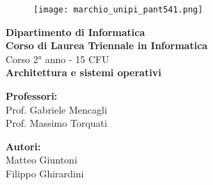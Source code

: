 \begin{titlepage} %
\begin{figure}[t] %
    \centering\texttt{[image: marchio\_unipi\_pant541.png]}
\end{figure}
\vspace{20mm}

\begin{Large}
 \begin{center}
	\textbf{Dipartimento di Informatica\\ Corso di Laurea Triennale in Informatica\\}
	\vspace{20mm}
    {\LARGE{Corso 2° anno - 15 CFU}}\\
	\vspace{10mm}
	{\huge{\bf Architettura e sistemi operativi}}\\
\end{center}
\end{Large}


\vspace{36mm}
\begin{minipage}[t]{0.47\textwidth}
	{\large{\bf Professori:}\\ \large{Prof. Gabriele Mencagli \\Prof. Massimo Torquati}}
\end{minipage}
\hfill
\begin{minipage}[t]{0.47\textwidth}\raggedleft
	{\large{\bf Autori:}\\ \large{Matteo Giuntoni \\ Filippo Ghirardini}}
\end{minipage}

\vspace{25mm}

\hrulefill

\vspace{5mm}


\end{titlepage}